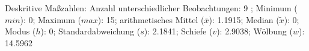 				\label{tableValues:prsa043e}
				\vspace*{-\baselineskip}
                    \begin{noten}
                	    \note{} Deskritive Maßzahlen:
                	    Anzahl unterschiedlicher Beobachtungen: 9%
                	    ; 
                	      Minimum ($min$): 0; 
                	      Maximum ($max$): 15; 
                	      arithmetisches Mittel ($\bar{x}$): \num[round-mode=places,round-precision=2]{1,1915}; 
                	      Median ($\tilde{x}$): 0; 
                	      Modus ($h$): 0; 
                	      Standardabweichung ($s$): \num[round-mode=places,round-precision=2]{2,1841}; 
                	      Schiefe ($v$): \num[round-mode=places,round-precision=2]{2,9038}; 
                	      Wölbung ($w$): \num[round-mode=places,round-precision=2]{14,5962}
                     \end{noten}


